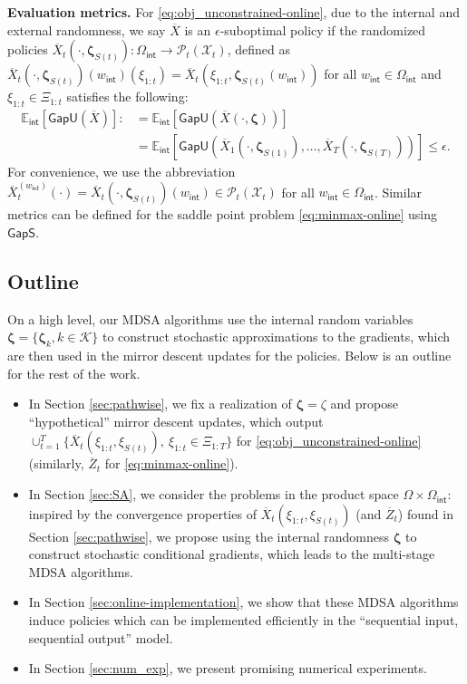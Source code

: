 \documentclass[11pt,fullpage,letterpaper]{article}
\newcommand{\mc}{\mathcal}
\newcommand{\E}{\mathbb{E}}
\newcommand{\bz}{\boldsymbol{\zeta}}
\newcommand{\internal}{\mathsf{int}}
\newcommand{\gaps}{\mathsf{GapS}}
\newcommand{\gapu}{\mathsf{GapU}}
\begin{document}
\textbf{Evaluation metrics.} For \eqref{eq:obj_unconstrained-online}, due to the internal and external randomness, we say $\overline{X}$ is an $\epsilon$-suboptimal policy if the randomized policies $\overline{X}_t(\cdot,\bz_{S(t)}):\Omega_{\internal}\to \mc P_t(\mc X_t)$, defined as $\overline{X}_t(\cdot,\bz_{S(t)})(w_{\internal})(\xi_{1:t}) = \overline{X}_t(\xi_{1:t},\bz_{S(t)}(w_{\internal}))$ for all $w_\internal\in \Omega_{\internal}$ and $\xi_{1:t}\in \Xi_{1:t}$ satisfies the following: 
\begin{align*}
    \E_{\internal}[\gapu(\overline{X})]:&=\E_{\internal}[\gapu(\overline{X}(\cdot,\bz))]\\
    &=\E_{\internal}[\gapu(\overline{X}_1(\cdot,\bz_{S(1)}),\ldots,\overline{X}_T(\cdot,\bz_{S(T)}))] \leq \epsilon. 
\end{align*}
For convenience, we use the abbreviation $\overline{X}_t^{(w_{\internal})}(\cdot) = \overline{X}_t(\cdot,\bz_{S(t)})(w_{\internal})\in \mc P_t(\mc X_t)$ for all $w_{\internal}\in \Omega_{\internal}$. Similar metrics can be defined for the saddle point problem \eqref{eq:minmax-online} using $\gaps$. 

\subsection{Outline}\label{sec:outline}
On a high level, our MDSA algorithms use the internal random variables $\bz=\{\bz_k,k\in \mc K\}$ to construct stochastic approximations to the gradients, which are then used in the mirror descent updates for the policies. Below is an outline for the rest of the work.
\begin{itemize}
    \item In Section \ref{sec:pathwise}, we fix a realization of $\bz = \zeta$ and propose ``hypothetical'' mirror descent updates, which output $\cup_{t=1}^T \{\overline{X}_t(\xi_{1:t},\xi_{S(t)}),~ \xi_{1:t}\in \Xi_{1:T}\}$ for \eqref{eq:obj_unconstrained-online} (similarly, $\overline{Z}_t$ for \eqref{eq:minmax-online}). 
    \item In Section \ref{sec:SA}, we consider the problems in the product space $\Omega\times\Omega_{\internal}$:
    inspired by the convergence properties of $\overline{X}_t(\xi_{1:t},\xi_{S(t)})$ (and $\overline{Z}_t$) found in Section \ref{sec:pathwise}, we propose using the internal randomness $\bz$ to construct stochastic conditional gradients, which leads to the multi-stage MDSA algorithms.
    \item In Section \ref{sec:online-implementation}, we show that these MDSA algorithms induce policies which can be implemented efficiently in the ``sequential input, sequential output'' model. 
    \item In Section \ref{sec:num_exp}, we present promising numerical experiments. 
\end{itemize}
\end{document}
